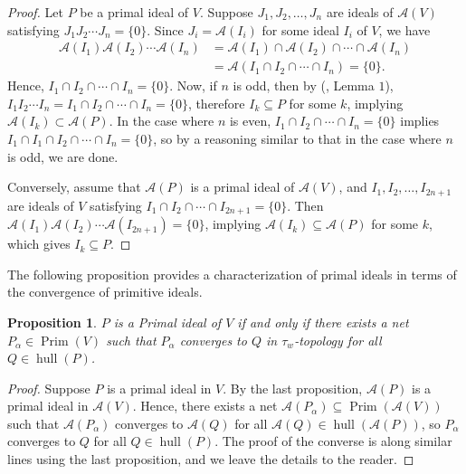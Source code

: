 \documentclass{birkjour}
\newtheorem{prop}[thm]{Proposition}
\theoremstyle{definition}
\theoremstyle{remark}
\numberwithin{equation}{section}
\begin{document}
\begin{proof}
 Let $P$ be a primal ideal of $V$. Suppose $J_1, J_2, \dotsc, J_n$ are ideals of $\mathcal{A}(V)$ satisfying $J_1 J_2 \dotsm J_n = \{0\}$. Since $J_i = \mathcal{A}(I_i)$ for some ideal $I_i$ of $V$, we have
    \begin{align*}
        \mathcal{A}(I_1)\mathcal{A}(I_2) \dotsm \mathcal{A}(I_n) &= \mathcal{A}(I_1) \cap \mathcal{A}(I_2) \cap \dotsm \cap \mathcal{A}(I_n) \\
        &= \mathcal{A}(I_1 \cap I_2 \cap \dotsm \cap I_n) = \{0\}.
    \end{align*}
    Hence, $I_1 \cap I_2 \cap \dotsm \cap I_n = \{0\}$. Now, if $n$ is odd, then by (\cite{AA}, Lemma $1$), $I_1I_2 \dotsm I_n = I_1 \cap I_2 \cap \dotsm \cap I_n = \{0\}$, therefore $I_k \subseteq P$ for some $k$, implying $\mathcal{A}(I_k) \subset \mathcal{A}(P)$. In the case where $n$ is even, $I_1 \cap I_2 \cap \dotsm \cap I_n = \{0\}$ implies $I_1 \cap I_1 \cap I_2 \cap \dotsm \cap I_n = \{0\}$, so by a reasoning similar to that in the case where $n$ is odd, we are done.

    Conversely, assume that $\mathcal{A}(P)$ is a primal ideal of $\mathcal{A}(V)$, and $I_1, I_2, \dotsc, I_{2 n+1}$ are ideals of $V$ satisfying $I_1 \cap I_2 \cap \dotsm \cap I_{2n+1} = \{0\}$. Then $\mathcal{A}(I_1)\mathcal{A}(I_2) \dotsm \mathcal{A}(I_{2 n+1}) = \{0\}$, implying $\mathcal{A}(I_k) \subseteq \mathcal{A}(P)$ for some $k$, which gives $I_k \subseteq P$.
\end{proof}

\pagebreak
The following proposition provides a characterization of primal ideals in terms of the convergence of primitive ideals.



\begin{prop}\label{prop34}
 $P$ is a Primal ideal of $V$ if and only if there exists a net $P_{\alpha} \in \operatorname{Prim}(V)$ such that $P_{\alpha}$ converges to $Q$ in $\tau_w$-topology for all $Q \in \operatorname{hull}(P)$.
\end{prop}

\begin{proof}
Suppose $P$ is a primal ideal in $V$. By the last proposition, $\mathcal{A}(P)$ is a primal ideal in $\mathcal{A}(V)$. Hence, there exists a net $\mathcal{A}(P_{\alpha}) \subseteq \operatorname{Prim}(\mathcal{A}(V))$ such that $\mathcal{A}(P_{\alpha})$ converges to $\mathcal{A}(Q)$ for all $\mathcal{A}(Q) \in \operatorname{hull}(\mathcal{A}(P))$, so $P_{\alpha}$ converges to $Q$ for all $Q \in \operatorname{hull}(P)$. The proof of the converse is along similar lines using the last proposition, and we leave the details to the reader.


\end{proof}
\end{document}
